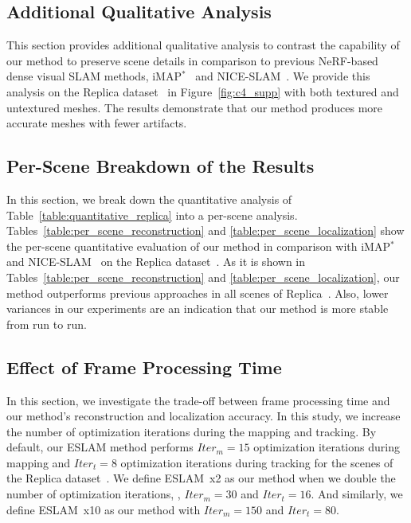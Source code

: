 \subsection{Additional Qualitative Analysis} \label{sec:c4_supp_additional}

This section provides additional qualitative analysis to contrast the capability of our method to preserve scene details in comparison to previous NeRF-based dense visual SLAM methods, iMAP$^*$~\citep{sucar2021imap} and NICE-SLAM~\citep{zhu2022nice}. We provide this analysis on the Replica dataset~\citep{replica19arxiv} in Figure~\ref{fig:c4_supp} with both textured and untextured meshes. The results demonstrate that our method produces more accurate meshes with fewer artifacts.

\subsection{Per-Scene Breakdown of the Results} \label{sec:c4_supp_per_scene}

In this section, we break down the quantitative analysis of Table~\ref{table:quantitative_replica} into a per-scene analysis. Tables~\ref{table:per_scene_reconstruction} and \ref{table:per_scene_localization} show the per-scene quantitative evaluation of our method in comparison with iMAP$^*$~\citep{sucar2021imap} and NICE-SLAM~\citep{zhu2022nice} on the Replica dataset~\citep{replica19arxiv}. As it is shown in Tables~\ref{table:per_scene_reconstruction} and \ref{table:per_scene_localization}, our method outperforms previous approaches in all scenes of Replica~\citep{replica19arxiv}. Also, lower variances in our experiments are an indication that our method is more stable from run to run.

\subsection{Effect of Frame Processing Time} \label{sec:c4_iters}

In this section, we investigate the trade-off between frame processing time and our method's reconstruction and localization accuracy. In this study, we increase the number of optimization iterations during the mapping and tracking. By default, our ESLAM method performs $Iter_{m}=15$ optimization iterations during mapping and $Iter_{t}=8$ optimization iterations during tracking for the scenes of the Replica dataset~\citep{replica19arxiv}. We define ESLAM~x2 as our method when we double the number of optimization iterations, \ie, $Iter_{m}=30$ and $Iter_{t}=16$. And similarly, we define ESLAM~x10 as our method with $Iter_{m}=150$ and $Iter_{t}=80$.

